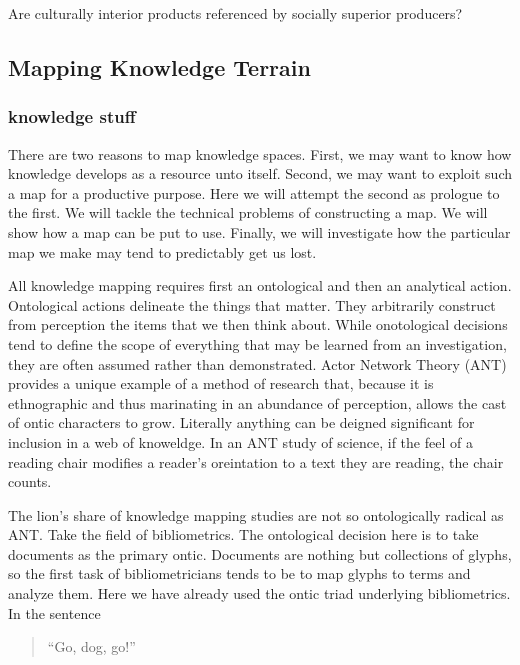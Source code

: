 \documentclass[]{book}
\theoremstyle{definition}
\theoremstyle{definition}
\theoremstyle{definition}
\theoremstyle{remark}
\begin{document}
Are culturally interior products referenced by socially superior
producers?

\hypertarget{wok}{%
\subsection{Mapping Knowledge Terrain}\label{wok}}

\hypertarget{knowledge-stuff}{%
\subsubsection{knowledge stuff}\label{knowledge-stuff}}

There are two reasons to map knowledge spaces. First, we may want to
know how knowledge develops as a resource unto itself. Second, we may
want to exploit such a map for a productive purpose. Here we will
attempt the second as prologue to the first. We will tackle the
technical problems of constructing a map. We will show how a map can be
put to use. Finally, we will investigate how the particular map we make
may tend to predictably get us lost.

All knowledge mapping requires first an ontological and then an
analytical action. Ontological actions delineate the things that matter.
They arbitrarily construct from perception the items that we then think
about. While onotological decisions tend to define the scope of
everything that may be learned from an investigation, they are often
assumed rather than demonstrated. Actor Network Theory (ANT) provides a
unique example of a method of research that, because it is ethnographic
and thus marinating in an abundance of perception, allows the cast of
ontic characters to grow. Literally anything can be deigned significant
for inclusion in a web of knoweldge. In an ANT study of science, if the
feel of a reading chair modifies a reader's oreintation to a text they
are reading, the chair counts.

The lion's share of knowledge mapping studies are not so ontologically
radical as ANT. Take the field of bibliometrics. The ontological
decision here is to take documents as the primary ontic. Documents are
nothing but collections of glyphs, so the first task of bibliometricians
tends to be to map glyphs to terms and analyze them. Here we have
already used the ontic triad underlying bibliometrics. In the sentence

\begin{quote}
``Go, dog, go!''
\end{quote}
\end{document}
